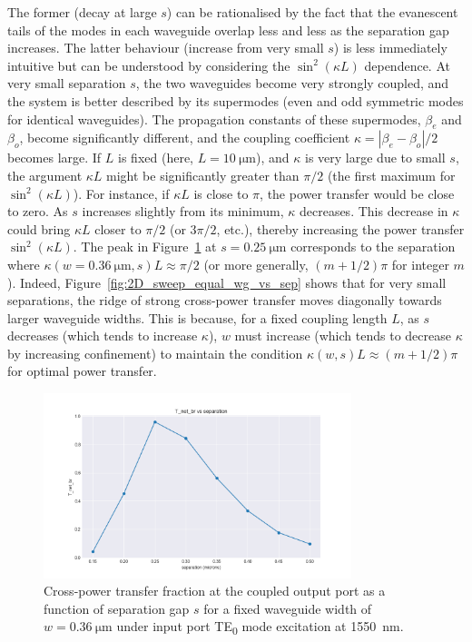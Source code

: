 \documentclass[10pt, a4paper]{article}
\begin{document}
The former (decay at large \(s\)) can be rationalised by the fact that the evanescent tails of the modes in each waveguide overlap less and less as the separation gap increases.
The latter behaviour (increase from very small \(s\)) is less immediately intuitive but can be understood by considering the \(\sin^2(\kappa L)\) dependence.
At very small separation \(s\), the two waveguides become very strongly coupled, and the system is better described by its supermodes (even and odd symmetric modes for identical waveguides). The propagation constants of these supermodes, \(\beta_e\) and \(\beta_o\), become significantly different, and the coupling coefficient \(\kappa = |\beta_e - \beta_o|/2\) becomes large.
If \(L\) is fixed (here, \(L=\SI{10}{\um}\)), and \(\kappa\) is very large due to small \(s\), the argument \(\kappa L\) might be significantly greater than \(\pi/2\) (the first maximum for \(\sin^2(\kappa L)\)). For instance, if \(\kappa L\) is close to \(\pi\), the power transfer would be close to zero. As \(s\) increases slightly from its minimum, \(\kappa\) decreases. This decrease in \(\kappa\) could bring \(\kappa L\) closer to \(\pi/2\) (or \(3\pi/2\), etc.), thereby increasing the power transfer \(\sin^2(\kappa L)\).
The peak in Figure~\ref{fig:coupled_power_ridge} at \(s=\SI{0.25}{\um}\) corresponds to the separation where \(\kappa(w=\SI{0.36}{\um}, s)L \approx \pi/2\) (or more generally, \((m+1/2)\pi\) for integer \(m\)).
Indeed, Figure~\ref{fig:2D_sweep_equal_wg_vs_sep} shows that for very small separations,
the ridge of strong cross-power transfer moves diagonally towards larger waveguide widths.
This is because, for a fixed coupling length \(L\), as \(s\) decreases (which tends to increase \(\kappa\)), \(w\) must increase (which tends to decrease \(\kappa\) by increasing confinement) to maintain the condition \(\kappa(w,s) L \approx (m+1/2)\pi\) for optimal power transfer.

\begin{figure}[h!]
  \centering
  \includegraphics[width=0.8\textwidth]{task3/sweep_plots/sweep_idx_10_sweep__coupling_length=10_wg1_width=0.3571428571428572_wg2_width=0.3571428571428572_separation=0.15_0.5_8_center_wavelength=1.55_T_net_br_line.png}
  \caption{Cross-power transfer fraction at the coupled output port as a function of separation gap \(s\) for a fixed waveguide width of \(w=\SI{0.36}{\um}\) under input port TE\textsubscript{0} mode excitation at \SI{1550}{\nm}.}
  \label{fig:coupled_power_ridge}
\end{figure}
\end{document}
